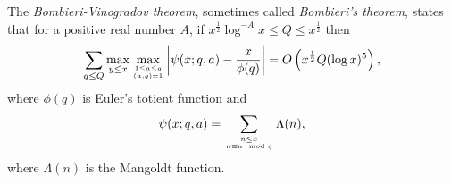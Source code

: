 \documentclass[12pt]{article}
\begin{document}
The \emph{Bombieri-Vinogradov theorem}, sometimes called \emph{Bombieri's theorem}, states that for a positive real number $A$, if $x^{\frac{1}{2}}\log^{-A}x\leq Q\leq x^{\frac{1}{2}}$ then $$\sum_{q\leq Q}\max_{y\leq x}\max_{1\le a\le q\atop (a,q) = 1}\left|\psi(x;q,a) - {x\over\phi(q)}\right| = O\left(x^{\frac{1}{2}}Q(\log x)^5\right),$$ where $\phi(q)$ is Euler's totient function and $$\psi(x;q,a)=\sum_{n\le x\atop n\equiv a\mod q}\Lambda(n),$$ where $\Lambda(n)$ is the Mangoldt function.
\end{document}
